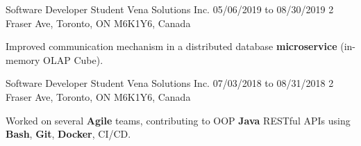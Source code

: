 \begin{cventries}
  \cventry
    {Software Developer Student} %
    {Vena Solutions Inc.} %
    {05/06/2019 to 08/30/2019} %
    {2 Fraser Ave, Toronto, ON M6K1Y6, Canada} %
    {
      \begin{cvitems} %
        \item{Improved communication mechanism in a distributed database \textbf{microservice} (in-memory OLAP Cube).}
%
      \end{cvitems}
    }
  \cventry
    {Software Developer Student} %
    {Vena Solutions Inc.} %
    {07/03/2018 to 08/31/2018} %
    {2 Fraser Ave, Toronto, ON M6K1Y6, Canada} %
    {
      \begin{cvitems} %
        \item{Worked on several \textbf{Agile} teams, contributing to OOP \textbf{Java} RESTful APIs using \textbf{Bash}, \textbf{Git}, \textbf{Docker}, CI/CD.}

\end{cvitems}}
\end{cventries}
